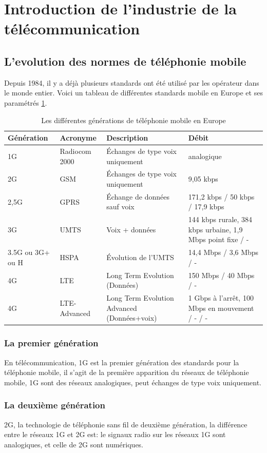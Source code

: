\section{Introduction de l'industrie de la télécommunication}
\subsection{L'evolution des normes de téléphonie mobile}
Depuis 1984, il y a déjà plusieurs standards ont été utilisé par les opérateur dans le monde entier. Voici un tableau de différentes standards mobile en Europe et ses paramétrés \ref{tbl:GMIE}. 
\begin{table}[H]
\begin{tabular}{|p{2cm}|p{2cm}|p{2cm}|p{4cm}|}
	\hline
	Génération&Acronyme&Description&Débit\\
	\hline
	1G		&Radiocom 2000	&Échanges de type voix uniquement&analogique\\
	\hline
	\hline
	2G		&GSM			&Échanges de type voix uniquement	&9,05 kbps\\
	\hline
	2,5G	&GPRS			&Échange de données sauf voix		&171,2 kbps / 50 kbps / 17,9 kbps\\
	\hline
	\hline
	3G		&UMTS			&Voix + données						&144 kbps rurale, 384 kbps urbaine, 1,9 Mbps point fixe / -\\
	\hline
	3.5G ou 3G+ ou H&HSPA	&Évolution de l'UMTS				&14,4 Mbps / 3,6 Mbps / -\\
	\hline
	\hline
	4G		&LTE			&Long Term Evolution (Données)				&150 Mbps / 40 Mbps / -\\
	\hline
	4G		&LTE-Advanced	&Long Term Evolution Advanced (Données+voix)		&1 Gbps à l'arrêt, 100 Mbps en mouvement / - / -\\
	\hline
\end{tabular}
\caption{Les différentes générations de téléphonie mobile en Europe}
 \label{tbl:GMIE}
\end{table}

\subsubsection{La premier génération}
En télécommunication, \textsf{1G} est la premier génération des standards pour la téléphonie mobile, il s'agit de la première apparition du réseaux de téléphonie mobile, 1G sont des réseaux analogiques, peut échanges de type voix uniquement.
\subsubsection{La deuxième génération}
\textsf{2G}, la technologie de téléphonie sans fil de deuxième génération, la différence entre le réseaux 1G et 2G est: le signaux radio sur les réseaux 1G sont analogiques, et celle de 2G sont numériques.

